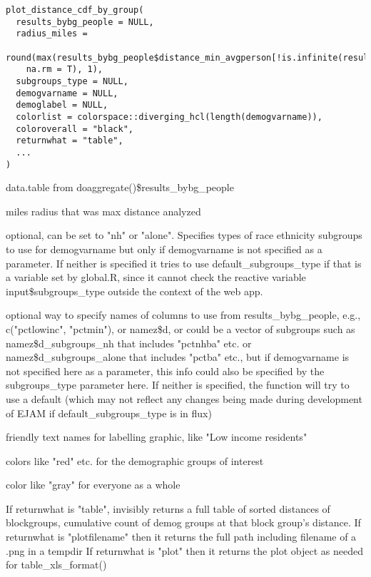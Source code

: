 \documentclass[a4paper]{book}
\begin{document}
%
\begin{Usage}
\begin{verbatim}
plot_distance_cdf_by_group(
  results_bybg_people = NULL,
  radius_miles =
    round(max(results_bybg_people$distance_min_avgperson[!is.infinite(results_bybg_people$distance_min_avgperson)],
    na.rm = T), 1),
  subgroups_type = NULL,
  demogvarname = NULL,
  demoglabel = NULL,
  colorlist = colorspace::diverging_hcl(length(demogvarname)),
  coloroverall = "black",
  returnwhat = "table",
  ...
)
\end{verbatim}
\end{Usage}
%
\begin{Arguments}
\begin{ldescription}
\item[\code{results\_bybg\_people}] data.table from doaggregate()\$results\_bybg\_people

\item[\code{radius\_miles}] miles radius that was max distance analyzed

\item[\code{subgroups\_type}] optional, can be set to "nh" or "alone".
Specifies types of race ethnicity subgroups to use for demogvarname
but only if demogvarname is not specified as a parameter.
If neither is specified it tries to use default\_subgroups\_type
if that is a variable set by global.R, since it cannot check the reactive variable input\$subgroups\_type
outside the context of the web app.

\item[\code{demogvarname}] optional way to specify names of columns to use from results\_bybg\_people,
e.g., c("pctlowinc", "pctmin"), or  namez\$d, or
could be a vector of subgroups such as namez\$d\_subgroups\_nh that includes "pctnhba" etc.
or namez\$d\_subgroups\_alone that includes "pctba" etc.,
but if demogvarname is not specified here as a parameter,
this info could also be specified by the subgroups\_type parameter here.
If neither is specified, the function will try to use a default
(which may not reflect any changes being made during development of EJAM if default\_subgroups\_type is in flux)

\item[\code{demoglabel}] friendly text names for labelling graphic, like "Low income residents"

\item[\code{colorlist}] colors like "red" etc. for the demographic groups of interest

\item[\code{coloroverall}] color like "gray" for everyone as a whole

\item[\code{returnwhat}] If returnwhat is "table", invisibly returns a
full table of sorted distances of blockgroups,
cumulative count of demog groups at that block group's distance.
If returnwhat is "plotfilename" then it returns the full path including filename of a .png in a tempdir
If returnwhat is "plot" then it returns the plot object as needed for table\_xls\_format()
\end{ldescription}
\end{Arguments}
\end{document}
